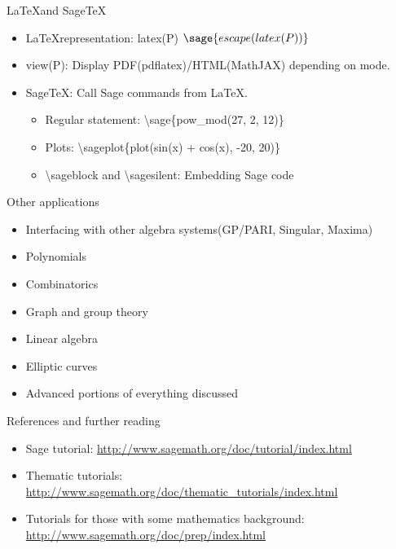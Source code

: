 \documentclass{beamer}
\begin{document}
\begin{frame}{\LaTeX and Sage\TeX}
 \begin{itemize}
   \item \LaTeX representation: latex(P) $\sage{escape(latex(P))}$
   \item view(P): Display PDF(pdflatex)/HTML(MathJAX) depending on mode.
   \item Sage\TeX: Call Sage commands from \LaTeX.
   \begin{itemize}
    \item Regular statement: \textbackslash sage\{pow\_mod(27, 2, 12)\}
    \item Plots: \textbackslash sageplot\{plot(sin(x) + cos(x), -20, 20)\}
    \item \textbackslash sageblock and \textbackslash sagesilent: Embedding Sage code
   \end{itemize}
 \end{itemize}
\end{frame}

\begin{frame}{Other applications}
 \begin{itemize}
  \item Interfacing with other algebra systems(GP/PARI, Singular, Maxima)
  \item Polynomials
  \item Combinatorics
  \item Graph and group theory
  \item Linear algebra
  \item Elliptic curves
  \item Advanced portions of everything discussed
 \end{itemize}
\end{frame}

\begin{frame}{References and further reading}
 \begin{itemize}
  \item Sage tutorial: \href{http://www.sagemath.org/doc/tutorial/index.html}{http://www.sagemath.org/doc/tutorial/index.html}
  \item Thematic tutorials: \href{http://www.sagemath.org/doc/thematic\_tutorials/index.html}{http://www.sagemath.org/doc/thematic\_tutorials/index.html}
  \item Tutorials for those with some mathematics background: \href{http://www.sagemath.org/doc/prep/index.html}{http://www.sagemath.org/doc/prep/index.html}
 \end{itemize}
\end{frame}
\end{document}
